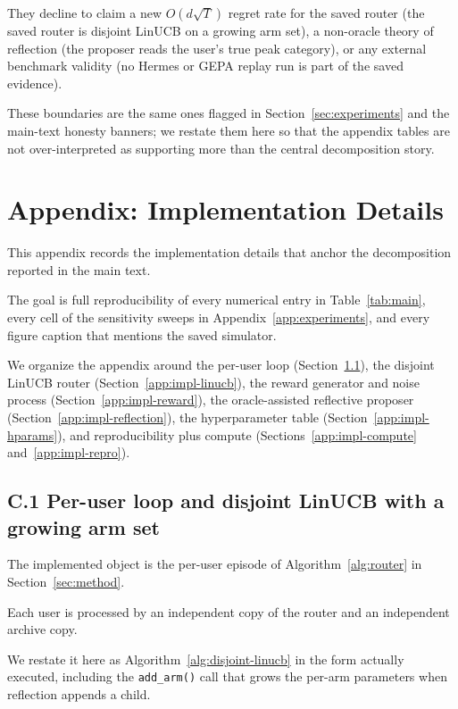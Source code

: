 \documentclass{article} %
\begin{document}
They decline to claim a new $O(d\sqrt{T})$ regret rate for the saved router (the saved router is disjoint LinUCB on a growing arm set), a non-oracle theory of reflection (the proposer reads the user's true peak category), or any external benchmark validity (no Hermes or GEPA replay run is part of the saved evidence).

These boundaries are the same ones flagged in Section~\ref{sec:experiments} and the main-text honesty banners; we restate them here so that the appendix tables are not over-interpreted as supporting more than the central decomposition story.

\section{Appendix: Implementation Details}

\label{app:implementation}

This appendix records the implementation details that anchor the decomposition reported in the main text.

The goal is full reproducibility of every numerical entry in Table~\ref{tab:main}, every cell of the sensitivity sweeps in Appendix~\ref{app:experiments}, and every figure caption that mentions the saved simulator.

We organize the appendix around the per-user loop (Section~\ref{app:impl-loop}), the disjoint LinUCB router (Section~\ref{app:impl-linucb}), the reward generator and noise process (Section~\ref{app:impl-reward}), the oracle-assisted reflective proposer (Section~\ref{app:impl-reflection}), the hyperparameter table (Section~\ref{app:impl-hparams}), and reproducibility plus compute (Sections~\ref{app:impl-compute} and~\ref{app:impl-repro}).

\subsection{C.1 Per-user loop and disjoint LinUCB with a growing arm set}

\label{app:impl-loop}

The implemented object is the per-user episode of Algorithm~\ref{alg:router} in Section~\ref{sec:method}.

Each user is processed by an independent copy of the router and an independent archive copy.

We restate it here as Algorithm~\ref{alg:disjoint-linucb} in the form actually executed, including the \texttt{add\_arm()} call that grows the per-arm parameters when reflection appends a child.
\end{document}
